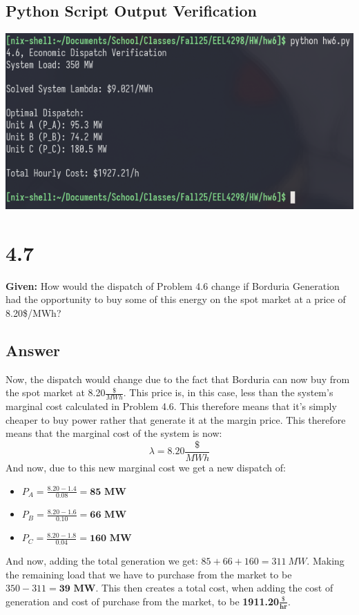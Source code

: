 \documentclass{article}
\begin{document}
\subsection{Python Script Output Verification}
\includegraphics[width=\textwidth]{apple.png}

\section{4.7}
\textbf{Given:} How would the dispatch of Problem 4.6 change if Borduria Generation had the opportunity to buy some of this energy on the spot market at a price of 8.20\$/MWh?
\subsection{Answer}
Now, the dispatch would change due to the fact that Borduria can now buy from the spot market at 8.20$\frac{\$}{MWh}$. This price is, in this case, less than the system's marginal cost calculated in Problem 4.6. This therefore means that it's simply cheaper to buy power rather that generate it at the margin price. This therefore means that the marginal cost of the system is now:
$$ \lambda = 8.20\frac{\$}{MWh} $$
And now, due to this new marginal cost we get a new dispatch of:
\begin{itemize}
	\item $ P_A = \frac{8.20 - 1.4}{0.08} = \textbf{85 MW} $
	\item $ P_B = \frac{8.20 - 1.6}{0.10} = \textbf{66 MW} $
	\item $ P_C = \frac{8.20 - 1.8}{0.04} = \textbf{160 MW} $
\end{itemize}
And now, adding the total generation we get: $85+66+160 = 311\ MW$. Making the remaining load that we have to purchase from the market to be $350 - 311 = \textbf{39 MW}$. This then creates a total cost, when adding the cost of generation and cost of purchase from the market, to be \textbf{1911.20}$\frac{\textbf{\$}}{\textbf{hr}}$.
\end{document}
